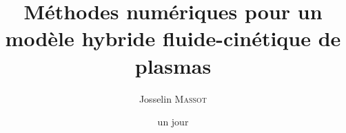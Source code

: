 





\author{Josselin \textsc{Massot}}

\title{Méthodes numériques pour un modèle hybride fluide-cinétique de plasmas}

\def\thetitleEN{Numerical methods for fluid-kinetic hybrid model of plasmas}

\date{un jour}


\numthese{} %

